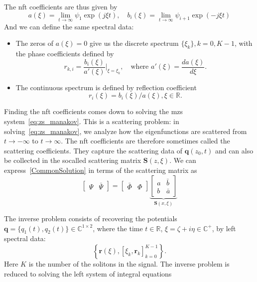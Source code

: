 The \acrshort{nft} coefficients are thus given by
$$
a(\xi)=\lim _{t \rightarrow \infty} \psi_1 \exp (j \xi t), \quad b_i(\xi)=\lim _{t \rightarrow \infty} \psi_{i+1} \exp (-j \xi t)
$$
And we can define the same spectral data:
\begin{itemize}
    \item The zeros of \(a(\xi) = 0\) give us the discrete spectrum \(\{\xi_k\}, k = 0, K - 1\),
    with the phase coefficients defined by
    \begin{equation}
        r_{k,i} = \frac{b_i(\xi)}{a'(\xi)} \Bigg|_{\xi=\xi_k}, \quad \text{where } a'(\xi) = \frac{da(\xi)}{d \xi}.
        \label{eq:manakov_rk}
    \end{equation}
    \item The continuous spectrum is defined by reflection coefficient 
    \begin{equation}
        r_i(\xi) = b_i(\xi)/a(\xi), \xi \in \mathbb{R} {.}
        \label{eq:manakov_r}
    \end{equation}
\end{itemize}

Finding the \acrshort{nft} coefficients comes down to solving the \acrshort{mzs} system~\eqref{eq:zs_manakov}. This is a scattering problem: in solving~\eqref{eq:zs_manakov}, we analyze how the eigenfunctions are scattered from $t \rightarrow-\infty$ to $t \rightarrow \infty$. The \acrshort{nft} coefficients are therefore sometimes called the scattering coefficients. They capture the scattering data of $\mathbf{q}\left(z_0, t\right)$ and can also be collected in the socalled scattering matrix $\mathbf{S}(z, \xi)$. We can express~\eqref{CommonSolution} in terms of the scattering matrix as
$$
\left[\begin{array}{ll}
\Psi & \bar{\Psi}
\end{array}\right]=\left[\begin{array}{ll}
\bar{\Phi} & \Phi
\end{array}\right] \underbrace{\left[\begin{array}{cc}
a & \bar{b} \\
b & \bar{a}
\end{array}\right]}_{\mathbf{S}(x, \xi)}
$$

%
The inverse problem consists of recovering the potentials $\mathbf{q} = \{q_1(t), q_2(t)\}\in \mathbb{C}^{1\times2}$, where the time $t \in \mathbb{R}$, $\xi=\zeta+i \eta \in \mathbb{C}^{+}$, by left spectral data:
%
\begin{equation}
    \left\{\mathbf{r}(\xi),\left[\xi_{k}, \mathbf{r}_{k}\right]_{k=0}^{K-1}\right\}.
\end{equation}
$$
$$
%
Here $K$ is the number of the solitons in the signal. The inverse problem is reduced to solving the left system of integral equations

